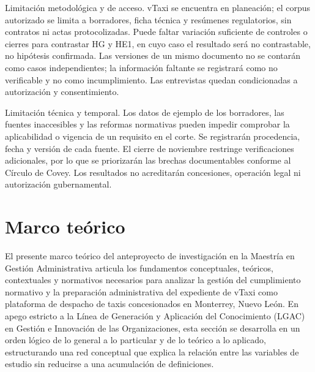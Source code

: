 {Limitación metodológica y de acceso. vTaxi se encuentra en planeación; el corpus autorizado se limita a borradores, ficha técnica y resúmenes regulatorios, sin contratos ni actas protocolizadas. Puede faltar variación suficiente de controles o cierres para contrastar HG y HE1, en cuyo caso el resultado será no contrastable, no hipótesis confirmada. Las versiones de un mismo documento no se contarán como casos independientes; la información faltante se registrará como no verificable y no como incumplimiento. Las entrevistas quedan condicionadas a autorización y consentimiento.


Limitación técnica y temporal. Los datos de ejemplo de los borradores, las fuentes inaccesibles y las reformas normativas pueden impedir comprobar la aplicabilidad o vigencia de un requisito en el corte. Se registrarán procedencia, fecha y versión de cada fuente. El cierre de noviembre restringe verificaciones adicionales, por lo que se priorizarán las brechas documentables conforme al Círculo de Covey. Los resultados no acreditarán concesiones, operación legal ni autorización gubernamental.


\section{Marco teórico}
El presente marco teórico del anteproyecto de investigación en la Maestría en Gestión Administrativa articula los fundamentos conceptuales, teóricos, contextuales y normativos necesarios para analizar la gestión del cumplimiento normativo y la preparación administrativa del expediente de vTaxi como plataforma de despacho de taxis concesionados en Monterrey, Nuevo León. En apego estricto a la Línea de Generación y Aplicación del Conocimiento (LGAC) en Gestión e Innovación de las Organizaciones, esta sección se desarrolla en un orden lógico de lo general a lo particular y de lo teórico a lo aplicado, estructurando una red conceptual que explica la relación entre las variables de estudio sin reducirse a una acumulación de definiciones.


}
